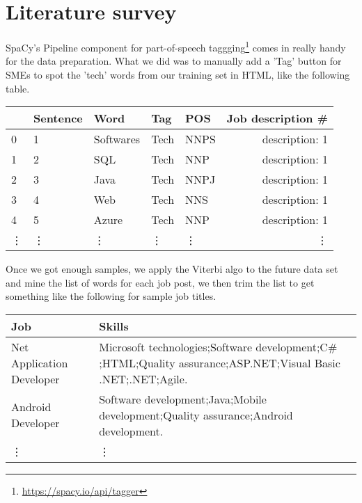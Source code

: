 \section{Literature survey}
SpaCy's Pipeline component for part-of-speech taggging\footnote{\url {https://spacy.io/api/tagger}} comes in  really handy for the data preparation. What we did was to manually add a 'Tag' button for SMEs to spot the 'tech' words from our training set in HTML, like the following table. 
	{
	\begin{center}
		\begin{tabular}{| l | l | l | l | l | r| }
			\hline
			&	Sentence	&	Word	&	Tag	 & POS &	Job description \# \\ \hline
			0	&	1	&	Softwares		&Tech	& NNPS	&description: 1 \\ \hline
			1	&	2	&	SQL	&	Tech	& NNP &	description: 1 \\ \hline
			2	&	3	&	Java	&	Tech & NNPJ	&	description: 1	\\ \hline
			3		&4		&Web	&	Tech	& NNS&	description: 1\\ \hline
			4	&	5	&	Azure		&Tech	& NNP	&description: 1\\ \hline
			\vdots	&		\vdots	&		\vdots		&	\vdots	&	\vdots	&	\vdots\\ \hline
		\end{tabular}
	\end{center}}
Once we got enough samples, we apply the Viterbi algo to the future data set and mine the list of words for each job post, we then trim the list to get  something like the following for sample job titles.  

\begin{center}
	\begin{tabular}{ | p{2.5cm} |p{4.5cm} |}
		\hline
		Job & Skills \\ \hline
	Net Application Developer& Microsoft technologies;Software development;C$\#$;HTML;Quality assurance;ASP.NET;Visual Basic .NET;.NET;Agile.\\\hline
		Android Developer	& Software development;Java;Mobile development;Quality assurance;Android development.\\\hline
		\vdots	&	\vdots\\ \hline
	\end{tabular}
\end{center}
